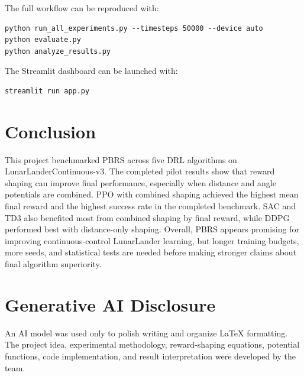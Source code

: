 \documentclass[conference,10pt]{IEEEtran}
\begin{document}
The full workflow can be reproduced with:
\begin{verbatim}
python run_all_experiments.py --timesteps 50000 --device auto
python evaluate.py
python analyze_results.py
\end{verbatim}
The Streamlit dashboard can be launched with:
\begin{verbatim}
streamlit run app.py
\end{verbatim}

\section{Conclusion}
This project benchmarked PBRS across five DRL algorithms on LunarLanderContinuous-v3. The completed pilot results show that reward shaping can improve final performance, especially when distance and angle potentials are combined. PPO with combined shaping achieved the highest mean final reward and the highest success rate in the completed benchmark. SAC and TD3 also benefited most from combined shaping by final reward, while DDPG performed best with distance-only shaping. Overall, PBRS appears promising for improving continuous-control LunarLander learning, but longer training budgets, more seeds, and statistical tests are needed before making stronger claims about final algorithm superiority.

\section*{Generative AI Disclosure}
An AI model was used only to polish writing and organize LaTeX formatting. The project idea, experimental methodology, reward-shaping equations, potential functions, code implementation, and result interpretation were developed by the team.
\end{document}
